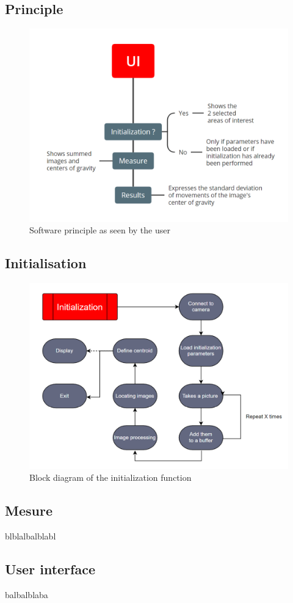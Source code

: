 \subsection{Principle}
\begin{figure}[H]
    \centering
    \includegraphics[scale=0.85]{assets/figures/Software/General.png}
    \caption{Software principle as seen by the user}
    \label{fig:Soft_General}
\end{figure}
\subsection{Initialisation}
\begin{figure}[H]
    \centering
    \includegraphics[scale=0.85]{assets/figures/Software/Initialization.png}
    \caption{Block diagram of the initialization function}
    \label{fig:Soft_Init}
\end{figure}
\subsection{Mesure}
blblalbalblabl
\subsection{User interface}
balbalblaba